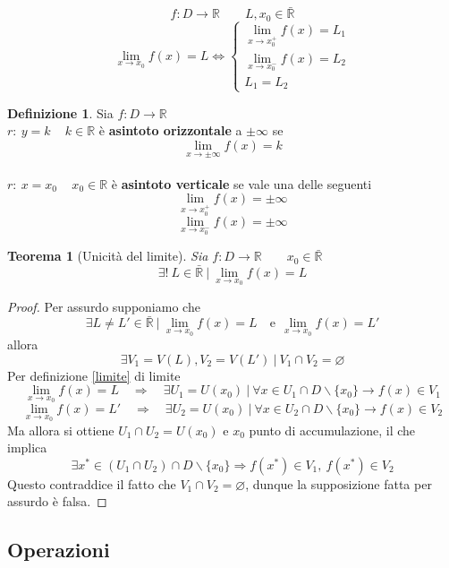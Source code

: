 \documentclass[]{report}
\theoremstyle{definition}
\newtheorem{defin}{Definizione}[chapter]
\theoremstyle{remark}
\theoremstyle{plain}
\newtheorem{theor}{Teorema}[chapter]
\numberwithin{equation}{chapter}
\begin{document}
$$f:D \rightarrow \mathbb{R} \qquad L, x_{0} \in \bar{\mathbb{R}}$$
$$\lim_{x\to x_{0}} f(x)=L \Leftrightarrow \left\{ \begin{array}{r}
	\lim_{x \to x_{0}^+} f(x) =L_{1}
\\	\lim_{x \to x_{0}^-} f(x) =L_{2}
\\	L_{1}=L_{2}
	\end{array}\right.$$

\begin{defin}\label{asintoto}
	Sia $f:D \rightarrow \mathbb{R}$
\\	$r: \ y=k \, \quad k \in \mathbb{R}$ \`{e} \textbf{asintoto orizzontale} a $\pm \infty$ se
	$$\lim_{x \to \pm \infty} f(x)=k$$
\\	$r: \ x=x_{0} \, \quad x_{0} \in \mathbb{R}$ \`{e} \textbf{asintoto verticale} se vale una delle seguenti
	$$\lim_{x \to x_{0}^+} f(x)=\pm \infty$$
	$$\lim_{x \to x_{0}^-} f(x)=\pm \infty$$
\end{defin}

\begin{theor}[Unicit\`{a} del limite]\label{th unlim}
	Sia $f:D\rightarrow \mathbb{R} \qquad x_{0} \in \bar{\mathbb{R}}$
	$$\exists ! \ L \in \bar{\mathbb{R}} \ | \ \lim_{x \to x_{0}}f(x)=L$$
\end{theor}
\begin{proof}
	Per assurdo supponiamo che 
	$$\exists L \neq L' \in \bar{\mathbb{R}} \ | \ \lim_{x \to x_{0}}f(x)=L \quad \textrm{e} \ \ \lim_{x \to x_{0}}f(x)=L'$$
	allora
	$$\exists V_{1}=V(L), V_{2}=V(L') \ | \ V_{1} \cap V_{2} = \varnothing$$
	Per definizione \ref{limite} di limite
	$$\lim_{x\to x_{0}} f(x)=L \quad \Longrightarrow \quad \exists U_{1}=U(x_{0}) \ | \ \forall x \in U_{1} \cap D \backslash \{x_{0}\} \rightarrow f(x) \in V_{1}$$
	$$\lim_{x\to x_{0}} f(x)=L' \quad \Longrightarrow \quad \exists U_{2}=U(x_{0}) \ | \ \forall x \in U_{2} \cap D \backslash \{x_{0}\} \rightarrow f(x) \in V_{2}$$
	Ma allora si ottiene $U_{1} \cap U_{2} = U(x_{0})$ e $x_{0}$ punto di accumulazione, il che implica
	$$\exists x^* \in  (U_{1} \cap U_{2}) \cap D \backslash \{x_{0}\} \Rightarrow f(x^*) \in V_{1}, \ f(x^*) \in V_{2}$$
	Questo contraddice il fatto che $V_{1} \cap V_{2} = \varnothing$, dunque la supposizione fatta per assurdo \`{e} falsa.
\end{proof}

\subsection{Operazioni}
\end{document}
